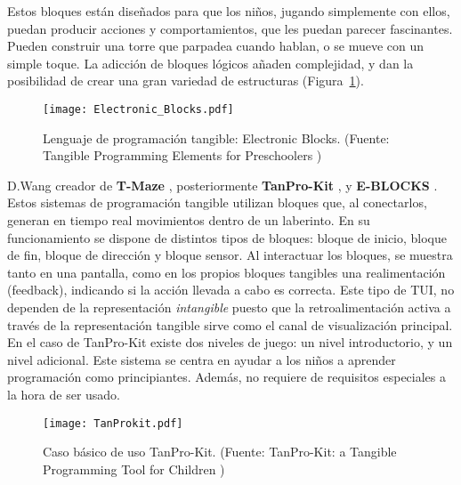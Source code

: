Estos bloques están diseñados para que los niños, jugando simplemente con ellos, puedan producir acciones y comportamientos, que les puedan parecer fascinantes. Pueden construir una torre que parpadea cuando hablan, o se mueve con un simple toque. La adicción de bloques lógicos añaden complejidad, y dan la posibilidad de crear una gran variedad de estructuras (Figura~\ref{fig:ElectronicBlocks}).

\begin{figure}[!h]
\begin{center}
\texttt{[image: Electronic\_Blocks.pdf]}
\caption{Lenguaje de programación tangible: Electronic Blocks. (Fuente: Tangible Programming Elements for Preschoolers \cite{Wyeth})}
\label{fig:ElectronicBlocks}
\end{center}
\end{figure}


D.Wang creador de \textbf{T-Maze} \cite{Wang_T-Maze}, posteriormente \textbf{TanPro-Kit} \cite{Wang_TanPro-kit}, y \textbf{E-BLOCKS} \cite{Wang_E-BLOCKS}. Estos sistemas de programación tangible utilizan bloques que, al conectarlos, generan en tiempo real movimientos dentro de un laberinto. En su funcionamiento se dispone de distintos tipos de bloques: bloque de inicio, bloque de fin, bloque de dirección y bloque sensor. Al interactuar los bloques, se muestra tanto en una pantalla, como en los propios bloques tangibles una realimentación (feedback), indicando si la acción llevada a cabo es correcta. Este tipo de TUI, no dependen de la representación \emph{intangible} puesto que la retroalimentación activa a través de la representación tangible sirve como el canal de visualización principal.
En el caso de TanPro-Kit existe dos niveles de juego: un nivel introductorio, y un nivel adicional. Este sistema se centra en ayudar a los niños a aprender programación como principiantes. Además, no requiere de requisitos especiales a la hora de ser usado.


\begin{figure}[!h]
\begin{center}
\texttt{[image: TanProkit.pdf]}
\caption{Caso básico de uso TanPro-Kit. (Fuente: TanPro-Kit: a Tangible Programming Tool for Children \cite{Wang_TanPro-kit})}
\label{fig:TanProKit}
\end{center}
\end{figure}


